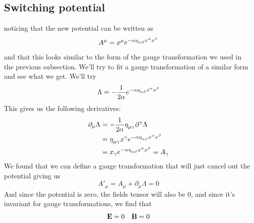 \subsection{Switching potential}
noticing that the new potential can be written as
\begin{equation}
  A^\mu=x^\mu e^{-\alpha\tensor{\eta}{_\alpha_\beta}x^\alpha x^\beta}
\end{equation}
and that this looks similar to the form of the gauge transformation we used in the previous subsection. We'll try to fit a gauge transformation of a similar form and see what we get. We'll try
\begin{equation}
  \Lambda = -\frac{1}{2\alpha}e^{-\alpha\tensor{\eta}{_\alpha_\beta}x^\alpha x^\beta}
\end{equation}
This gives us the following derivatives:
\begin{align}
	\partial_\mu\Lambda&= -\frac{1}{2\alpha}\tensor{\eta}{_\mu_\gamma}\partial^\gamma\Lambda\\
	&= \tensor{\eta}{_\mu_\gamma}x^\gamma e^{-\alpha\tensor{\eta}{_\alpha_\beta}x^\alpha x^\beta}\\
	&= x_\gamma e^{-\alpha\tensor{\eta}{_\alpha_\beta}x^\alpha x^\beta}=A_\gamma
\end{align}
We found that we can define a gauge transformation that will just cancel out the potential giving us
\begin{equation}
  A'_\mu=A_\mu+\partial_\mu\Lambda=0
\end{equation}
And since the potential is zero, the fields tensor will also be 0, and since it's invariant for gauge transformations, we find that
\begin{align}
	\bold E=0 && \bold B=0
\end{align}